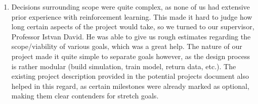 \documentclass{article}
\begin{document}
\begin{enumerate}
    \item
        Decisions surrounding scope were quite complex, as none of us had extensive prior experience with reinforcement learning.
        This made it hard to judge how long certain aspects of the project would take, so we turned to our supervisor, Professor Istvan David.
        He was able to give us rough estimates regarding the scope/viability of various goals, which was a great help.
        The nature of our project made it quite simple to separate goals however, as the design process is rather modular (build simulation, train model, return data, etc.).
        The existing project description provided in the potential projects document also helped in this regard, as certain milestones were already marked as optional, making them clear contenders for stretch goals.

\end{enumerate}
\end{document}
